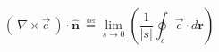 \begin{equation}
    (~\nabla \times \vec{e}~) \cdot \mathbf{\hat{n}} \
        \overset{\underset{\mathrm{def}}{}}{=}
    \lim_{s \to 0}\left( \frac{1}{|s|}\oint_{c} \vec{e} \cdot d\mathbf{r}\right)
\end{equation}